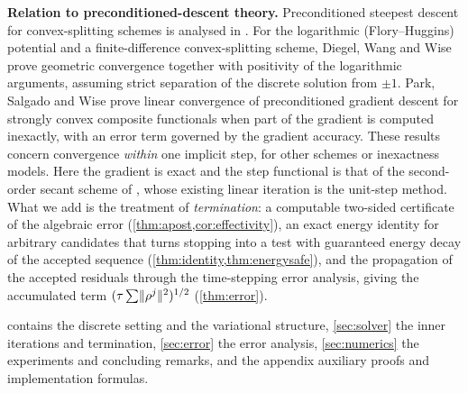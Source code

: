 \medskip\noindent\textbf{Relation to preconditioned-descent theory.} Preconditioned steepest descent for convex-splitting schemes is analysed in \cite{FengSalgadoWangWise2017,ChenWangWise2022}. For the logarithmic (Flory--Huggins) potential and a finite-difference convex-splitting scheme, Diegel, Wang and Wise \cite{DiegelWangWise2025} prove geometric convergence together with positivity of the logarithmic arguments, assuming strict separation of the discrete solution from $\pm1$. Park, Salgado and Wise \cite{ParkSalgadoWise2025} prove linear convergence of preconditioned gradient descent for strongly convex composite functionals when part of the gradient is computed inexactly, with an error term governed by the gradient accuracy. These results concern convergence \emph{within} one implicit step, for other schemes or inexactness models. Here the gradient is exact and the step functional is that of the second-order secant scheme of \cite{ChengWangWiseYue2016}, whose existing linear iteration is the unit-step method. What we add is the treatment of \emph{termination}: a computable two-sided certificate of the algebraic error (\cref{thm:apost,cor:effectivity}), an exact energy identity for arbitrary candidates that turns stopping into a test with guaranteed energy decay of the accepted sequence (\cref{thm:identity,thm:energysafe}), and the propagation of the accepted residuals through the time-stepping error analysis, giving the accumulated term $(\tau\sum\lVert \rho^j\rVert^2)^{1/2}$ (\cref{thm:error}).

 contains the discrete setting and the variational structure, \cref{sec:solver} the inner iterations and termination, \cref{sec:error} the error analysis, \cref{sec:numerics} the experiments and concluding remarks, and the appendix auxiliary proofs and implementation formulas.
